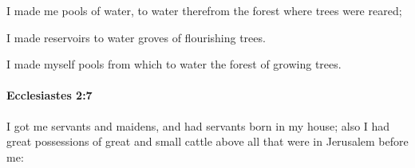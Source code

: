 			\begin{versebox}
					\item[BHS] 
					\item[LXX] 
					\item[ASV] I made me pools of water, to water therefrom the forest where trees were reared;
					\item[NIV] I made reservoirs to water groves of flourishing trees.
					\item[NRSV] I made myself pools from which to water the forest of growing trees.
			\end{versebox}

		\paragraph{Ecclesiastes 2:7} %
			\label{ECCLESIASTES-2-7}

			I got me servants and maidens, and had servants born in my house; also I had great possessions of great and small cattle above all that were in Jerusalem before me:

